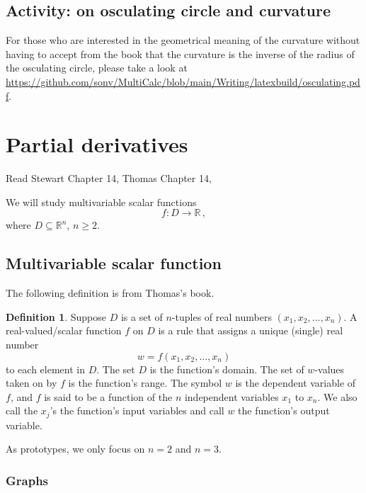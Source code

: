 \documentclass[
]{article}
\theoremstyle{definition}
\newtheorem{definition}{Definition}[section]
\theoremstyle{definition}
\theoremstyle{definition}
\theoremstyle{definition}
\theoremstyle{remark}
\begin{document}
\hypertarget{activity-on-osculating-circle-and-curvature}{%
\subsection{Activity: on osculating circle and curvature}\label{activity-on-osculating-circle-and-curvature}}

For those who are interested in the geometrical meaning of the curvature without having
to accept from the book that the curvature is the inverse of the radius of the osculating circle,
please take a look at \url{https://github.com/sonv/MultiCalc/blob/main/Writing/latexbuild/osculating.pdf}.

\newpage

\hypertarget{partial-derivatives}{%
\section{Partial derivatives}\label{partial-derivatives}}

Read Stewart Chapter 14, Thomas Chapter 14,

We will study multivariable scalar functions
\[ f: D \to \mathbb{R}\,,\]
where \(D\subseteq \mathbb{R}^n\), \(n\geq 2\).

\hypertarget{multivariable-scalar-function}{%
\subsection{Multivariable scalar function}\label{multivariable-scalar-function}}

The following definition is from Thomas's book.

\begin{definition}
Suppose \(D\) is a set of \(n\)-tuples of real numbers \((x_1, x_2, \ldots, x_n)\).
A real-valued/scalar function \(f\) on \(D\) is a rule that assigns a unique (single) real
number
\[w = f(x_1, x_2, \ldots, x_n)\]
to each element in \(D\).
The set \(D\) is the function's domain. The set of \(w\)-values taken on by \(f\) is
the function's range. The symbol \(w\) is the dependent variable of \(f\), and \(f\)
is said to be a function of the \(n\) independent variables \(x_1\) to \(x_n\).
We also call the \(x_j\)'s the function's input variables and call \(w\) the function's output variable.
\end{definition}

As prototypes, we only focus on \(n=2\) and \(n=3\).

\hypertarget{graphs}{%
\subsubsection{Graphs}\label{graphs}}
\end{document}
